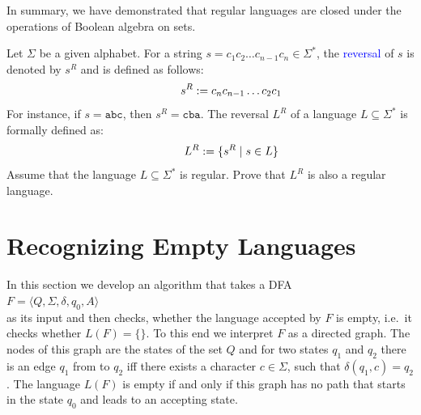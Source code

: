 In summary, we have demonstrated that regular languages are closed under the operations of Boolean algebra on sets.
\pagebreak


\exerciseEng
Let \(\Sigma\) be a given alphabet. For a string \(s = c_1 c_2 \ldots c_{n-1} c_n \in \Sigma^*\), the \textcolor{blue}{reversal}  of \(s\) is denoted by \(s^R\) and is defined as follows:
\[
\hspace*{1.3cm}
s^R := c_n c_{n-1} \ldots c_2 c_1
\]
For instance, if \(s = \mathtt{abc}\), then \(s^R = \mathtt{cba}\). The reversal \(L^R\) of a language \(L \subseteq \Sigma^*\) is formally defined as:
\[
\hspace*{1.3cm}
L^R := \{ s^R \mid s \in L \}
\]
Assume that the language \(L \subseteq \Sigma^*\) is regular.  Prove that \(L^R\) is also a regular language. \eox


\section{Recognizing Empty Languages \label{section:leer}}
In this section we develop an algorithm that takes a  \textsc{DFA}
\\[0.2cm]
\hspace*{1.3cm}
$F = \langle Q, \Sigma, \delta, q_0, A \rangle$
\\[0.2cm]
as its input and then checks, whether the language accepted by $F$ is empty, i.e.~it checks whether 
$L(F) = \{\}$.  To this end we interpret $F$ as a directed graph.  The nodes of this graph are the
states of the set $Q$ and for two states $q_1$ and
$q_2$ there is an edge  $q_1$ from to $q_2$ iff there exists a character $c \in \Sigma$, such that $\delta(q_1,
c) = q_2$.  
The language $L(F)$ is empty if and only if this graph has no path that starts in the state
$q_0$ and leads to an accepting state.

